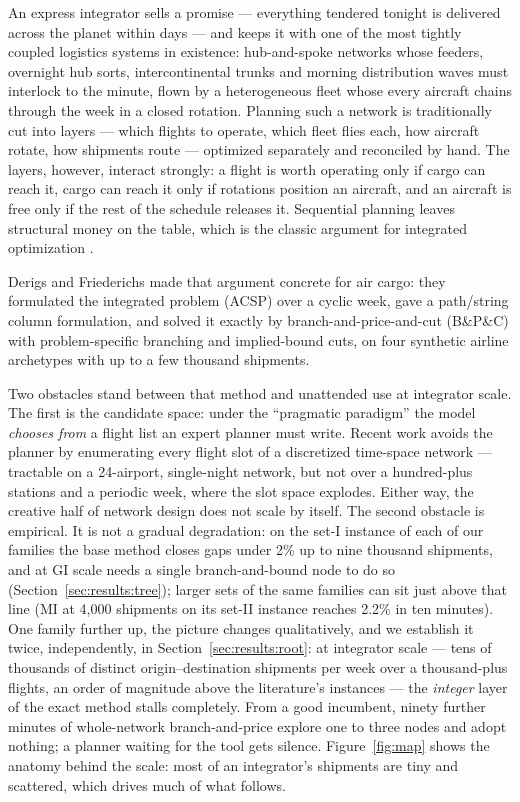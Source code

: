 \documentclass[11pt]{article}
\newcommand{\acsp}{ACSP}
\begin{document}
An express integrator sells a promise --- everything tendered tonight is
delivered across the planet within days --- and keeps it with one of the
most tightly coupled logistics systems in existence: hub-and-spoke networks
whose feeders, overnight hub sorts, intercontinental trunks and morning
distribution waves must interlock to the minute, flown by a heterogeneous
fleet whose every aircraft chains through the week in a closed rotation.
Planning such a network is traditionally cut into layers --- which flights
to operate, which fleet flies each, how aircraft rotate, how shipments
route --- optimized separately and reconciled by hand. The layers, however,
interact strongly: a flight is worth operating only if cargo can reach it,
cargo can reach it only if rotations position an aircraft, and an aircraft
is free only if the rest of the schedule releases it. Sequential planning
leaves structural money on the table, which is the classic argument for
integrated optimization \cite{crainic2000,feng2015}.

Derigs and Friederichs \cite{derigs2013} made that argument concrete for
air cargo: they formulated the integrated problem (\acsp{}) over a cyclic
week, gave a path/string column formulation, and solved it exactly by
branch-and-price-and-cut (B\&P\&C) with problem-specific branching and
implied-bound cuts, on four synthetic airline archetypes with up to a few
thousand shipments.

Two obstacles stand between that method and unattended use at integrator
scale. The first is the candidate space: under the ``pragmatic paradigm''
the model \emph{chooses from} a flight list an expert planner must write.
Recent work avoids the planner by enumerating every flight slot of a
discretized time-space network \cite{zhu2026} --- tractable on a
24-airport, single-night network, but not over a hundred-plus stations and
a periodic week, where the slot space explodes. Either way, the creative
half of network design does not scale by itself. The second obstacle is
empirical. It is not a gradual degradation: on the set-I instance of each
of our families the base method closes gaps under 2\% up to nine thousand
shipments, and at GI scale needs a single branch-and-bound node to do so
(Section~\ref{sec:results:tree}); larger sets of the same families can sit
just above that line (MI at 4{,}000 shipments on its set-II instance
reaches 2.2\% in ten minutes). One family further up, the picture
changes qualitatively, and we establish it twice, independently, in
Section~\ref{sec:results:root}:
at integrator scale --- tens of thousands of distinct origin--destination
shipments per week over a thousand-plus flights, an order of magnitude
above the literature's instances --- the \emph{integer} layer of the
exact method stalls completely. From a good incumbent, ninety further
minutes of whole-network branch-and-price explore one to three nodes and
adopt nothing; a planner waiting for the tool gets silence.
Figure~\ref{fig:map} shows the anatomy behind the scale: most of an
integrator's shipments are tiny and scattered, which drives much of what
follows.
\end{document}
